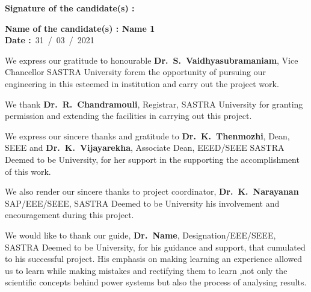 \documentclass[a4paper, 12pt, oneside]{sastra1}
\begin{document}
	\noindent\textbf{Signature of the candidate(s)	:}	
	
	\noindent\textbf{Name of the candidate(s)\hspace{7mm}		: Name 1}\\
	
	\noindent\textbf{Date\hspace*{43.5mm}					:}~31~/~03~/~2021\\%
	
		\newpage
	
	\externalcertificate
	
	
	
	
	\acknowledgements
	
	\hspace*{12pt} We express our gratitude to honourable \textbf{Dr.~S.~Vaidhyasubramaniam}, Vice Chancellor SASTRA University forcm the opportunity of pursuing our engineering in this esteemed in institution and carry out the project work.
	
	\par We thank \textbf{Dr.~R.~Chandramouli}, Registrar, SASTRA University for granting permission and extending the facilities in carrying out this project.
	
	\par We express our sincere thanks and gratitude to \textbf{Dr.~K.~Thenmozhi}, Dean, SEEE and \textbf{Dr.~K.~Vijayarekha}, Associate Dean, EEED/SEEE SASTRA Deemed to be University, for her support in the supporting the accomplishment of this work.
	
	\par We also render our sincere thanks to project coordinator, \textbf{Dr.~K.~Narayanan} SAP/EEE/SEEE, SASTRA Deemed to be University his involvement and encouragement during this project.
	
	\par We would like to thank our guide, \textbf{Dr.~Name}, Designation/EEE/SEEE, SASTRA Deemed to be University, for his guidance and support, that cumulated to his successful project. His emphasis on making learning an experience allowed us to learn while making mistakes and rectifying them to learn ,not only the scientific concepts behind power systems but also the process of analysing results.
	
\end{document}
